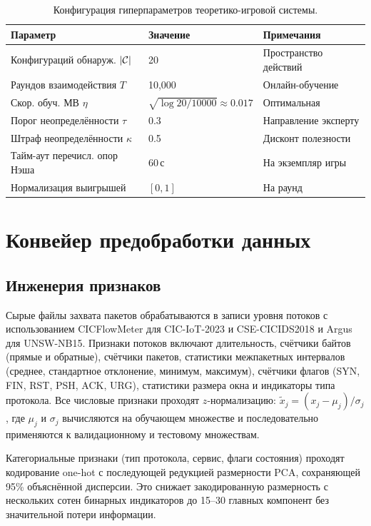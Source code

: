 \begin{table}[htbp]
\centering
\caption{Конфигурация гиперпараметров теоретико-игровой системы.}
\label{tab:hp_game}
\begin{tabular}{lll}
\toprule
Параметр & Значение & Примечания \\
\midrule
Конфигураций обнаруж. $|\mathcal{C}|$ & 20 & Пространство действий \\
Раундов взаимодействия $T$ & 10{,}000 & Онлайн-обучение \\
Скор. обуч. МВ $\eta$      & $\sqrt{\log 20/10000}\approx0.017$ & Оптимальная \\
Порог неопределённости $\tau$ & 0.3 & Направление эксперту \\
Штраф неопределённости $\kappa$ & 0.5 & Дисконт полезности \\
Тайм-аут перечисл. опор Нэша & 60\,с & На экземпляр игры \\
Нормализация выигрышей     & $[0,1]$ & На раунд \\
\bottomrule
\end{tabular}
\end{table}


\section{Конвейер предобработки данных}
\label{app:preprocessing}

\subsection{Инженерия признаков}
\label{app:features}

Сырые файлы захвата пакетов обрабатываются в записи уровня потоков с использованием CICFlowMeter для CIC-IoT-2023 и CSE-CICIDS2018 и Argus для UNSW-NB15. Признаки потоков включают длительность, счётчики байтов (прямые и обратные), счётчики пакетов, статистики межпакетных интервалов (среднее, стандартное отклонение, минимум, максимум), счётчики флагов (SYN, FIN, RST, PSH, ACK, URG), статистики размера окна и индикаторы типа протокола. Все числовые признаки проходят $z$-нормализацию: $\tilde{x}_j = (x_j-\mu_j)/\sigma_j$, где $\mu_j$ и $\sigma_j$ вычисляются на обучающем множестве и последовательно применяются к валидационному и тестовому множествам.

Категориальные признаки (тип протокола, сервис, флаги состояния) проходят кодирование one-hot с последующей редукцией размерности PCA, сохраняющей 95\% объяснённой дисперсии. Это снижает закодированную размерность с нескольких сотен бинарных индикаторов до 15--30 главных компонент без значительной потери информации.

